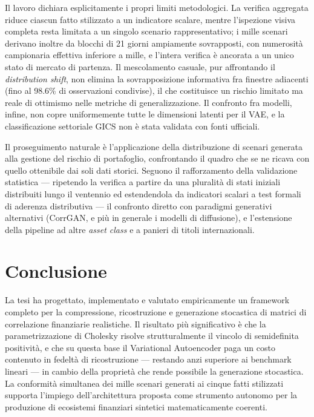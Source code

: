 \documentclass[11pt,a4paper]{article}
\begin{document}
Il lavoro dichiara esplicitamente i propri limiti metodologici. La verifica
aggregata riduce ciascun fatto stilizzato a un indicatore scalare, mentre
l'ispezione visiva completa resta limitata a un singolo scenario
rappresentativo; i mille scenari derivano inoltre da blocchi di 21 giorni
ampiamente sovrapposti, con numerosità campionaria effettiva inferiore a
mille, e l'intera verifica è ancorata a un unico stato di mercato di partenza.
Il mescolamento casuale, pur affrontando il \emph{distribution shift}, non
elimina la sovrapposizione informativa fra finestre adiacenti (fino al 98.6\%
di osservazioni condivise), il che costituisce un rischio limitato ma reale di
ottimismo nelle metriche di generalizzazione. Il confronto fra modelli, infine,
non copre uniformemente tutte le dimensioni latenti per il VAE, e la
classificazione settoriale GICS non è stata validata con fonti ufficiali.

Il proseguimento naturale è l'applicazione della distribuzione di scenari
generata alla gestione del rischio di portafoglio, confrontando il quadro che
se ne ricava con quello ottenibile dai soli dati storici. Seguono il
rafforzamento della validazione statistica --- ripetendo la verifica a partire
da una pluralità di stati iniziali distribuiti lungo il ventennio ed
estendendola da indicatori scalari a test formali di aderenza distributiva ---
il confronto diretto con paradigmi generativi alternativi (CorrGAN, e più in
generale i modelli di diffusione), e l'estensione della pipeline ad altre
\emph{asset class} e a panieri di titoli internazionali.

\section{Conclusione}

La tesi ha progettato, implementato e valutato empiricamente un framework completo per la
compressione, ricostruzione e generazione stocastica di matrici di
correlazione finanziarie realistiche. Il risultato più significativo è che la
parametrizzazione di Cholesky risolve strutturalmente il vincolo di
semidefinita positività, e che su questa base il Variational Autoencoder paga
un costo contenuto in fedeltà di ricostruzione --- restando anzi superiore ai
benchmark lineari --- in cambio della proprietà che rende possibile la
generazione stocastica. La conformità simultanea dei mille scenari generati ai
cinque fatti stilizzati supporta l'impiego dell'architettura proposta come strumento autonomo
per la produzione di ecosistemi finanziari sintetici matematicamente coerenti.
\end{document}
